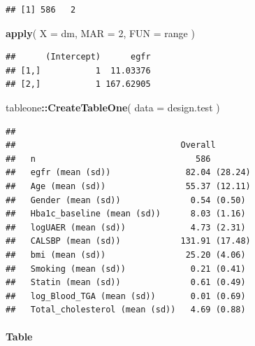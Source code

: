 \documentclass[]{article}
\newenvironment{Shaded}{\begin{snugshade}}{\end{snugshade}}
\newcommand{\DataTypeTok}[1]{\textcolor[rgb]{0.13,0.29,0.53}{#1}}
\newcommand{\DecValTok}[1]{\textcolor[rgb]{0.00,0.00,0.81}{#1}}
\newcommand{\KeywordTok}[1]{\textcolor[rgb]{0.13,0.29,0.53}{\textbf{#1}}}
\newcommand{\NormalTok}[1]{#1}
\newcommand{\OperatorTok}[1]{\textcolor[rgb]{0.81,0.36,0.00}{\textbf{#1}}}
\let\oldparagraph\paragraph
\renewcommand{\paragraph}[1]{\oldparagraph{#1}\mbox{}}
\begin{document}
\begin{verbatim}
## [1] 586   2
\end{verbatim}

\begin{Shaded}
\begin{Highlighting}[]
\KeywordTok{apply}\NormalTok{( }\DataTypeTok{X =}\NormalTok{ dm, }\DataTypeTok{MAR =} \DecValTok{2}\NormalTok{, }\DataTypeTok{FUN =}\NormalTok{ range )}
\end{Highlighting}
\end{Shaded}

\begin{verbatim}
##      (Intercept)      egfr
## [1,]           1  11.03376
## [2,]           1 167.62905
\end{verbatim}

\begin{Shaded}
\begin{Highlighting}[]
\NormalTok{tableone}\OperatorTok{::}\KeywordTok{CreateTableOne}\NormalTok{( }\DataTypeTok{data =}\NormalTok{ design.test )}
\end{Highlighting}
\end{Shaded}

\begin{verbatim}
##                                
##                                 Overall       
##   n                                586        
##   egfr (mean (sd))               82.04 (28.24)
##   Age (mean (sd))                55.37 (12.11)
##   Gender (mean (sd))              0.54 (0.50) 
##   Hba1c_baseline (mean (sd))      8.03 (1.16) 
##   logUAER (mean (sd))             4.73 (2.31) 
##   CALSBP (mean (sd))            131.91 (17.48)
##   bmi (mean (sd))                25.20 (4.06) 
##   Smoking (mean (sd))             0.21 (0.41) 
##   Statin (mean (sd))              0.61 (0.49) 
##   log_Blood_TGA (mean (sd))       0.01 (0.69) 
##   Total_cholesterol (mean (sd))   4.69 (0.88)
\end{verbatim}

\newpage

\hypertarget{table-1}{%
\paragraph{Table}\label{table-1}}
\end{document}
